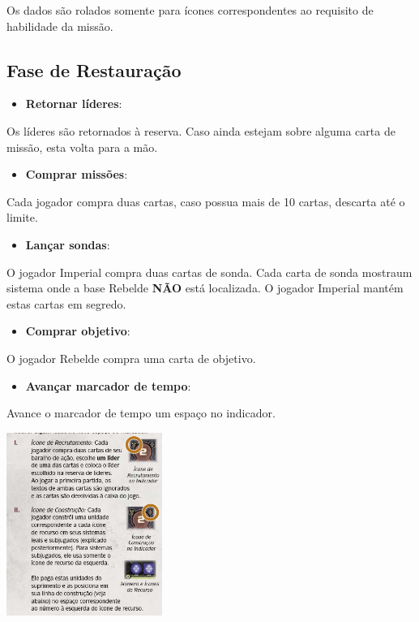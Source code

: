 \documentclass[11pt]{article}
\begin{document}
Os dados são rolados somente para ícones correspondentes ao requisito de habilidade da missão.

\subsection{Fase de Restauração}
\label{sec:orge5f895f}

\begin{itemize}
\item \textbf{Retornar líderes}:
\end{itemize}

Os líderes são retornados à reserva. Caso ainda estejam sobre alguma carta de missão, esta volta para a mão.

\begin{itemize}
\item \textbf{Comprar missões}:
\end{itemize}

Cada jogador compra duas cartas, caso possua mais de 10 cartas, descarta até o limite.

\begin{itemize}
\item \textbf{Lançar sondas}:
\end{itemize}

O jogador Imperial compra duas cartas de sonda. Cada carta de sonda mostraum sistema onde a base Rebelde \textbf{NÃO} está localizada. O jogador Imperial mantém estas cartas em segredo.

\begin{itemize}
\item \textbf{Comprar objetivo}:
\end{itemize}

O jogador Rebelde compra uma carta de objetivo.

\begin{itemize}
\item \textbf{Avançar marcador de tempo}:
\end{itemize}

Avance o marcador de tempo um espaço no indicador.

\begin{center}
\includegraphics[width=2.0in]{./time-marker.png}
\end{center}
\end{document}
